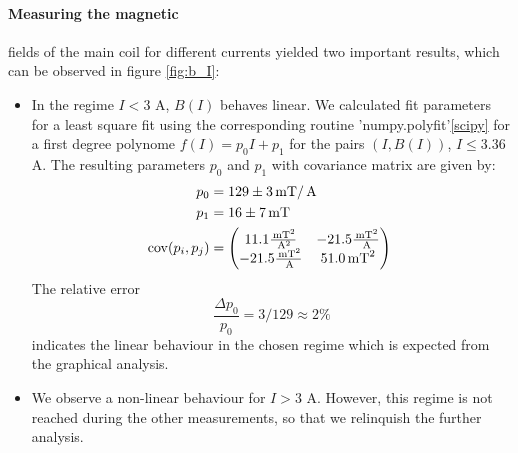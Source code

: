 \paragraph{Measuring the magnetic}
fields of the main coil for different currents yielded two 
important results, which can be observed in figure \ref{fig:b_I}:
\begin{itemize}
    \item
        In the regime $I < 3$ A, $B(I)$ behaves linear. We calculated fit parameters 
        for a least square fit using the corresponding routine 'numpy.polyfit'\ref{scipy} for 
        a first degree polynome $f(I) = p_0 I + p_1$ for the pairs $(I, B(I))$, $I \le 3.36$ A. 
        The resulting parameters $p_0$ and $p_1$ with covariance matrix are given by:
        \begin{align}
            p_0 &= 129 \pm 3 \, \mathrm{mT} / \, \mathrm{A}\\
            p_1 &= 16 \pm 7 \, \mathrm{mT}\\
            \mathrm{cov}(p_i, p_j) &= 
            \begin{pmatrix}
                11.1\frac{\, \mathrm{mT}^2}{\, \mathrm{A}^2} &-21.5\frac{\, \mathrm{mT}^2}{\, \mathrm{A}} \\
                -21.5\frac{\, \mathrm{mT}^2}{\, \mathrm{A}} &51.0\, \mathrm{mT}^2 \\
            \end{pmatrix} 
            \, \mathrm{}
        \end{align}
        The relative error 
        \begin{equation}
            \frac{\Delta p_0}{p_0} = 3 / 129 \approx 2\%
        \end{equation}
        indicates the linear behaviour in the chosen regime which is expected from the 
        graphical analysis. 
    \item
        We observe a non-linear behaviour for $I > 3$ A. However, this regime is 
        not reached during the other measurements, so that we relinquish the further analysis. 
\end{itemize}
